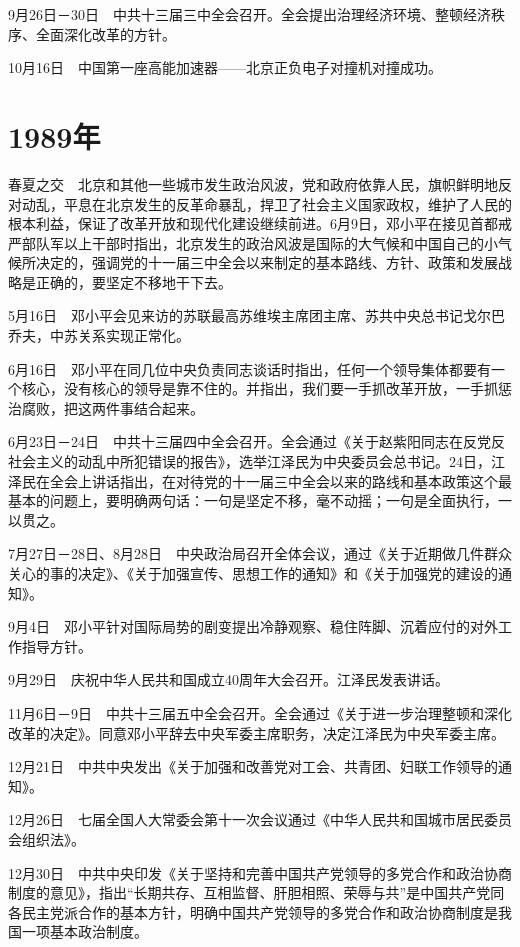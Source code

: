 \documentclass[10pt,a4paper,twocolumn]{book}
\begin{document}
9月26日－30日　中共十三届三中全会召开。全会提出治理经济环境、整顿经济秩序、全面深化改革的方针。

10月16日　中国第一座高能加速器——北京正负电子对撞机对撞成功。

\section{1989年}

春夏之交　北京和其他一些城市发生政治风波，党和政府依靠人民，旗帜鲜明地反对动乱，平息在北京发生的反革命暴乱，捍卫了社会主义国家政权，维护了人民的根本利益，保证了改革开放和现代化建设继续前进。6月9日，邓小平在接见首都戒严部队军以上干部时指出，北京发生的政治风波是国际的大气候和中国自己的小气候所决定的，强调党的十一届三中全会以来制定的基本路线、方针、政策和发展战略是正确的，要坚定不移地干下去。

5月16日　邓小平会见来访的苏联最高苏维埃主席团主席、苏共中央总书记戈尔巴乔夫，中苏关系实现正常化。

6月16日　邓小平在同几位中央负责同志谈话时指出，任何一个领导集体都要有一个核心，没有核心的领导是靠不住的。并指出，我们要一手抓改革开放，一手抓惩治腐败，把这两件事结合起来。

6月23日－24日　中共十三届四中全会召开。全会通过《关于赵紫阳同志在反党反社会主义的动乱中所犯错误的报告》，选举江泽民为中央委员会总书记。24日，江泽民在全会上讲话指出，在对待党的十一届三中全会以来的路线和基本政策这个最基本的问题上，要明确两句话：一句是坚定不移，毫不动摇；一句是全面执行，一以贯之。

7月27日－28日、8月28日　中央政治局召开全体会议，通过《关于近期做几件群众关心的事的决定》、《关于加强宣传、思想工作的通知》和《关于加强党的建设的通知》。

9月4日　邓小平针对国际局势的剧变提出冷静观察、稳住阵脚、沉着应付的对外工作指导方针。

9月29日　庆祝中华人民共和国成立40周年大会召开。江泽民发表讲话。

11月6日－9日　中共十三届五中全会召开。全会通过《关于进一步治理整顿和深化改革的决定》。同意邓小平辞去中央军委主席职务，决定江泽民为中央军委主席。

12月21日　中共中央发出《关于加强和改善党对工会、共青团、妇联工作领导的通知》。

12月26日　七届全国人大常委会第十一次会议通过《中华人民共和国城市居民委员会组织法》。

12月30日　中共中央印发《关于坚持和完善中国共产党领导的多党合作和政治协商制度的意见》，指出“长期共存、互相监督、肝胆相照、荣辱与共”是中国共产党同各民主党派合作的基本方针，明确中国共产党领导的多党合作和政治协商制度是我国一项基本政治制度。
\end{document}
